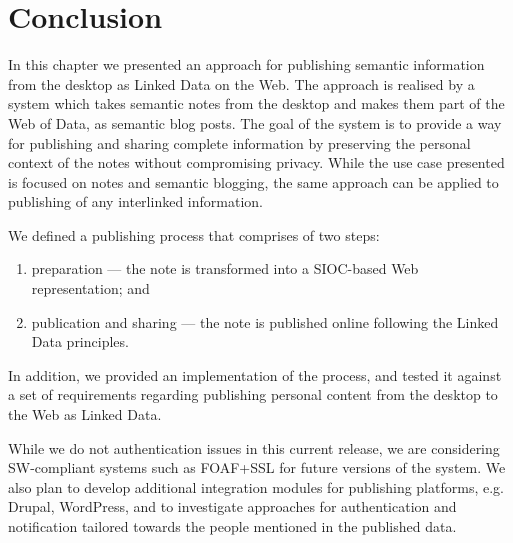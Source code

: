 



\section{Conclusion}

In this chapter we presented an approach for publishing semantic information from the desktop as Linked Data on the Web. The approach is realised by a system which takes semantic notes from the desktop and makes them part of the Web of Data, as semantic blog posts. The goal of the system is to provide a way for publishing and sharing complete information by preserving the personal context of the notes without compromising privacy. While the use case presented is focused on notes and semantic blogging, the same approach can be applied to publishing of any interlinked information. 

We defined a publishing process that comprises of two steps:
\begin{enumerate}
 \item preparation --- the note is transformed into a SIOC-based Web representation; and
 \item publication and sharing --- the note is published online following the Linked Data principles.
\end{enumerate}

In addition, we provided an implementation of the process, and tested it against a set of requirements regarding publishing personal content from the desktop to the Web as Linked Data.

While we do not authentication issues in this current release, we are considering SW-compliant systems such as FOAF+SSL \cite{Story2009} for future versions of the system.
We also plan to develop additional integration modules for publishing platforms, e.g. Drupal, WordPress, and to investigate approaches for authentication and notification tailored towards the people mentioned in the published data.
